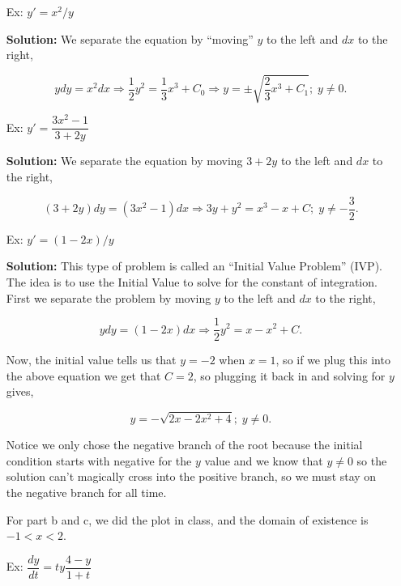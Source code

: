 \documentclass[reqno]{amsart}
\theoremstyle{definition}
\begin{document}
\begin{enumerate}

\item[Ex:  ]  $y' = x^2/y$

\textbf{Solution:  }  We separate the equation by ``moving'' $y$ to the left and $dx$ to the right,

\begin{equation*}
ydy = x^2dx \Rightarrow \frac{1}{2}y^2 = \frac{1}{3}x^3 + C_0
\Rightarrow y = \pm \sqrt{\frac{2}{3}x^3 + C_1};\; y \neq 0.
\end{equation*}

\item[Ex:  ]  $y' = \dfrac{3x^2 - 1}{3 + 2y}$

\textbf{Solution:  } We separate the equation by moving $3+2y$ to the left and
$dx$ to the right,

\begin{equation*}
(3+2y)dy = (3x^2-1)dx \Rightarrow 3y + y^2 = x^3 - x + C;\; y \neq -\frac{3}{2}.
\end{equation*}

\item[Ex:  ]  $y' = (1-2x)/y$

\textbf{Solution:  }
This type of problem is called an ``Initial Value Problem'' (IVP).  The idea
is to use the Initial Value to solve for the constant of integration.  First we separate
the problem by moving $y$ to the left and $dx$ to the right,

\begin{equation*}
ydy = (1-2x)dx \Rightarrow \frac{1}{2}y^2 = x - x^2 + C.
\end{equation*}

Now, the initial value tells us that $y = -2$ when $x = 1$, so if we plug this into
the above equation we get that $C = 2$, so plugging it back in and solving for $y$
gives,

\begin{equation*}
y = -\sqrt{2x - 2x^2 + 4};\; y \neq 0.
\end{equation*}

Notice we only chose the negative branch of the root because the initial condition
starts with negative for the $y$ value and we know that $y \neq 0$ so the solution
can't magically cross into the positive branch, so we must stay on the negative branch
for all time.

For part b and c, we did the plot in class, and the domain of existence is $-1<x<2$.

\item[Ex:  ]  $\dfrac{dy}{dt} = ty\dfrac{4-y}{1+t}$


\end{enumerate}
\end{document}
